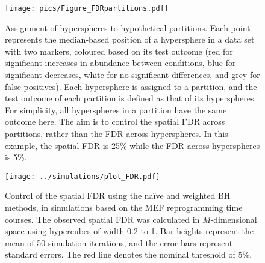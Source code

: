 \documentclass{article}
\begin{document}
\begin{figure}[tbp]
    \begin{center}
        \texttt{[image: pics/Figure\_FDRpartitions.pdf]}
    \end{center}
    \caption{Assignment of hyperspheres to hypothetical partitions.
        Each point represents the median-based position of a hypersphere in a data set with two markers, coloured based on its test outcome
        (red for significant increases in abundance between conditions, blue for significant decreases, white for no significant differences, and grey for false positives).
        Each hypersphere is assigned to a partition, and the test outcome of each partition is defined as that of its hyperspheres.
        For simplicity, all hyperspheres in a partition have the same outcome here.
        The aim is to control the spatial FDR across partitions, rather than the FDR across hyperspheres.
        In this example, the spatial FDR is 25\% while the FDR across hyperspheres is 5\%.
}
    \label{fig:fdrdemo}
\end{figure}

\begin{figure}[bt]
    \begin{center}
        \texttt{[image: ../simulations/plot\_FDR.pdf]}
    \end{center}
    \caption{
        Control of the spatial FDR using the na\"ive and weighted BH methods, in simulations based on the MEF reprogramming time courses.
        The observed spatial FDR was calculated in $M$-dimensional space using hypercubes of width 0.2 to 1.
        Bar heights represent the mean of 50 simulation iterations, and the error bars represent standard errors.
        The red line denotes the nominal threshold of 5\%.
    }
    \label{fig:fdr}
\end{figure}

\end{document}
